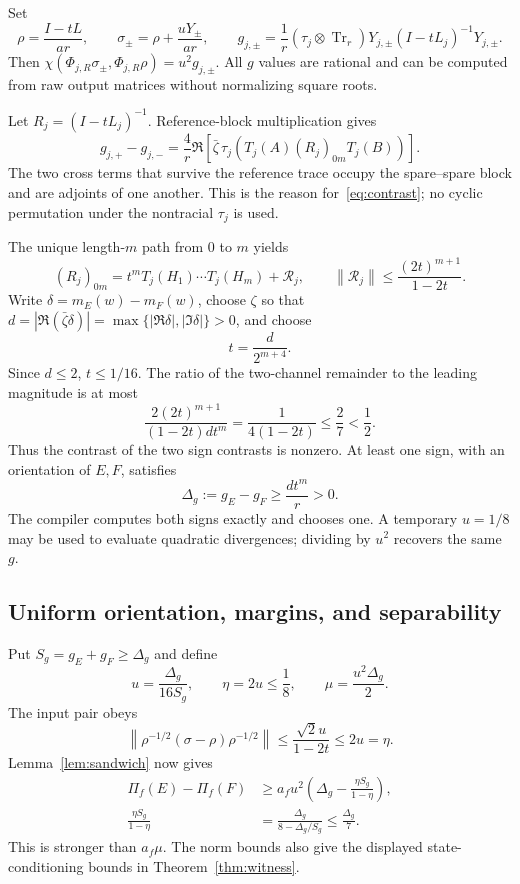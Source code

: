 \documentclass[11pt,a4paper]{article}
\theoremstyle{definition}\newtheorem{definition}[theorem]{Definition}
\newcommand{\Tr}{\operatorname{Tr}}
\newcommand{\norm}[1]{\left\lVert #1\right\rVert}
\newcommand{\abs}[1]{\left|#1\right|}
\begin{document}
Set
\begin{equation}\label{eq:states}
 \rho=\frac{I-tL}{ar},\qquad
 \sigma_\pm=\rho+\frac{uY_\pm}{ar},\qquad
 g_{j,\pm}=\frac1r(\tau_j\otimes\Tr_r)
  Y_{j,\pm}(I-tL_j)^{-1}Y_{j,\pm}.
\end{equation}
Then $\chi(\Phi_{j,R}\sigma_\pm,\Phi_{j,R}\rho)=u^2g_{j,\pm}$. All $g$ values are rational and can be computed from raw output matrices without normalizing square roots.

Let $R_j=(I-tL_j)^{-1}$. Reference-block multiplication gives
\begin{equation}\label{eq:contrast}
 g_{j,+}-g_{j,-}
 =\frac4r\Re\left[\bar\zeta\,
 \tau_j(T_j(A)(R_j)_{0m}T_j(B))\right].
\end{equation}
The two cross terms that survive the reference trace occupy the spare--spare block and are adjoints of one another. This is the reason for~\eqref{eq:contrast}; no cyclic permutation under the nontracial $\tau_j$ is used.

The unique length-$m$ path from $0$ to $m$ yields
\[
 (R_j)_{0m}=t^m T_j(H_1)\cdots T_j(H_m)+\mathcal R_j,
 \qquad
 \norm{\mathcal R_j}\le\frac{(2t)^{m+1}}{1-2t}.
\]
Write $\delta=m_E(w)-m_F(w)$, choose $\zeta$ so that
$d=\abs{\Re(\bar\zeta\delta)}=\max\{|\Re\delta|,|\Im\delta|\}>0$, and choose
\begin{equation}\label{eq:witness-t}
 t=\frac{d}{2^{m+4}}.
\end{equation}
Since $d\le2$, $t\le1/16$. The ratio of the two-channel remainder to the leading magnitude is at most
\[
 \frac{2(2t)^{m+1}}{(1-2t)dt^m}
 =\frac1{4(1-2t)}\le\frac27<\frac12.
\]
Thus the contrast of the two sign contrasts is nonzero. At least one sign, with an orientation of $E,F$, satisfies
\begin{equation}\label{eq:Delta}
 \Delta_g:=g_E-g_F\ge\frac{dt^m}{r}>0.
\end{equation}
The compiler computes both signs exactly and chooses one. A temporary $u=1/8$ may be used to evaluate quadratic divergences; dividing by $u^2$ recovers the same $g$.

\subsection{Uniform orientation, margins, and separability}

Put $S_g=g_E+g_F\ge\Delta_g$ and define
\begin{equation}\label{eq:final-u}
 u=\frac{\Delta_g}{16S_g},\qquad
 \eta=2u\le\frac18,\qquad
 \mu=\frac{u^2\Delta_g}{2}.
\end{equation}
The input pair obeys
\[
 \norm{\rho^{-1/2}(\sigma-\rho)\rho^{-1/2}}
 \le\frac{\sqrt2 u}{1-2t}\le2u=\eta.
\]
Lemma~\ref{lem:sandwich} now gives
\begin{align*}
 \Pi_f(E)-\Pi_f(F)
 &\ge a_fu^2\left(\Delta_g-\frac{\eta S_g}{1-\eta}\right),\\
 \frac{\eta S_g}{1-\eta}
 &=\frac{\Delta_g}{8-\Delta_g/S_g}\le\frac{\Delta_g}{7}.
\end{align*}
This is stronger than $a_f\mu$. The norm bounds also give the displayed state-conditioning bounds in Theorem~\ref{thm:witness}.
\end{document}
